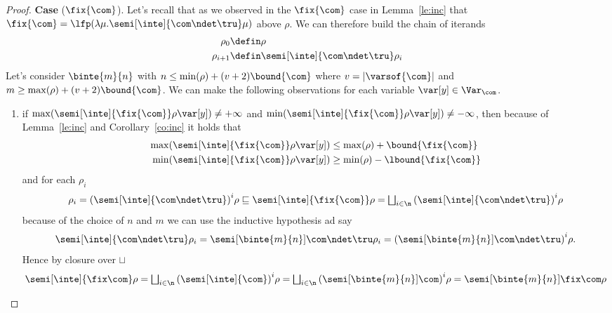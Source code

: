 \begin{proof}
  \medskip
  
  \noindent
  \textbf{Case} (\(\fix{\com}\)).
  Let's recall that as we observed in the \(\fix{\com}\) case in
  Lemma~\ref{le:inc} that
  \({\fix{\com} = \lfp(\lambda \mu . \semi[\inte]{\com \ndet
      \tru}\mu)}\) above \(\rho\). We can therefore build the chain of
  iterands
  \begin{align*}
    \rho_0 & \defin \rho \\
    \rho_{i+1} & \defin \semi[\inte]{\com \ndet \tru}\rho_i
  \end{align*}
  Let's consider \(\binte{m}{n}\) with
  \(n \leq \min(\rho) + (v+2)\bound{\com}\) where
  \(v = |\varsof{\com}|\) and
  \(m \geq \max(\rho) + (v+2)\bound{\com}\). We can make the following
  observations for each variable \(\var[y]\in \Var_{\com}\).
  \begin{enumerate}[label=(\roman*)]
  \item if
    \({\max(\semi[\inte]{\fix{\com}}\rho\var[y]) \neq +\infty}\) and
    \({\min(\semi[\inte]{\fix{\com}}\rho\var[y]) \neq -\infty}\), then
    because of Lemma~\ref{le:inc} and Corollary~\ref{co:inc} it holds
    that
    \begin{align*}
      \max(\semi[\inte]{\fix{\com}}\rho\var[y]) & \leq \max(\rho) + \bound{\fix{\com}} \\
      \min(\semi[\inte]{\fix{\com}}\rho\var[y]) & \geq \min(\rho) - \lbound{\fix{\com}}
    \end{align*}
    and for each \(\rho_i\)
    \begin{equation*}
      \rho_i = {\left(\semi[\inte]{\com \ndet \tru}\right)}^i\rho \sqsubseteq
      \semi[\inte]{\fix{\com}}\rho = 
      \textstyle\bigsqcup_{i\in\n} {\left(\semi[\inte]{\com \ndet \tru}\right)}^i\rho
    \end{equation*}
    because of the choice of \(n\) and \(m\) we can use the inductive
    hypothesis ad say
    \begin{equation*}
      \semi[\inte]{\com \ndet \tru}\rho_i =
      \semi[\binte{m}{n}]{\com \ndet \tru}\rho_i =
      {\left(\semi[\binte{m}{n}]{\com\ndet \tru}\right)}^i\rho.
    \end{equation*}
    Hence  by closure over \(\sqcup\)
    \begin{equation*}
      \semi[\inte]{\fix\com}\rho =
      \textstyle\bigsqcup_{i\in\n} {\left(\semi[\inte]{\com}\right)}^i\rho = 
      \textstyle\bigsqcup_{i\in\n} {\left(\semi[\binte{m}{n}]{\com}\right)}^i\rho = 
      \semi[\binte{m}{n}]{\fix\com}\rho
    \end{equation*}
    

\end{enumerate}
\end{proof}
